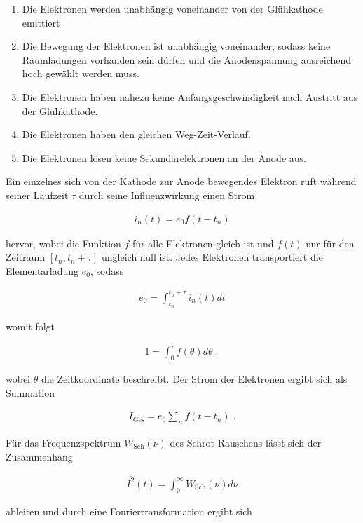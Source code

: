 \begin{enumerate}
	\item Die Elektronen werden unabhängig voneinander von der Glühkathode emittiert
	\item Die Bewegung der Elektronen ist unabhängig voneinander, sodass keine Raumladungen vorhanden sein dürfen und die Anodenspannung ausreichend hoch gewählt werden muss.
	\item Die Elektronen haben nahezu keine Anfangsgeschwindigkeit nach Austritt aus der Glühkathode.
	\item Die Elektronen haben den gleichen Weg-Zeit-Verlauf.
	\item Die Elektronen lösen keine Sekundärelektronen an der Anode aus.
\end{enumerate}

Ein einzelnes sich von der Kathode zur Anode bewegendes Elektron ruft während seiner Laufzeit $\tau$ durch seine Influenzwirkung einen Strom

\begin{align}
i_n(t) = e_0 f(t - t_n)
\end{align}

hervor, wobei die Funktion $f$ für alle Elektronen gleich ist und $f(t)$ nur für den Zeitraum $[t_n, t_n + \tau]$ ungleich null ist. Jedes Elektronen transportiert die Elementarladung $e_0$, sodass

\begin{align}
e_0 = \int_{t_n}^{t_n + \tau} i_n(t) dt
\end{align}

womit folgt

\begin{align}
1 = \int_{0}^{\tau} f(\theta) d\theta \;,
\end{align}

wobei $\theta$ die Zeitkoordinate beschreibt. Der Strom der Elektronen ergibt sich als Summation

\begin{align}
I_{\textrm{Ges}} = e_0 \sum_n f(t-t_n) \;.
\end{align}

Für das Frequenzspektrum $W_{\textrm{Sch}}(\nu)$ des Schrot-Rauschens lässt sich der Zusammenhang

\begin{align}
\overline{I^2}(t) = \int_0^\infty W_{\textrm{Sch}}(\nu) d\nu \label{eqn:WSch_1}
\end{align}

ableiten und durch eine Fouriertransformation ergibt sich

